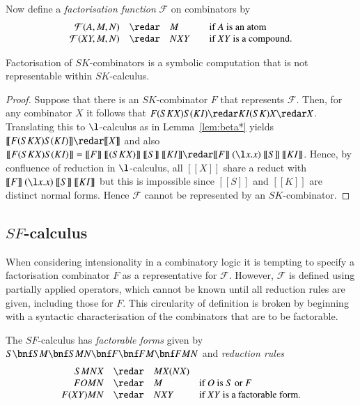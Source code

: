 \documentclass{llncs}
\def\ltrans{[\![}
\def\rtrans{]\!]}
\renewcommand{\rew}{\redar}
\begin{document}
Now define a {\em factorisation function} ${\mathcal F}$ on
combinators by
\[
\begin{array}{rcll}
{\mathcal F}(A,M,N) &\rew& M &\mbox{if $A$ is an atom}\\
{\mathcal F}(XY,M,N) &\rew& NXY \quad&\mbox{if $XY$ is a compound.} 
\end{array}
\]


\begin{lemma}
\label{lem:noFinSK:1}
Factorisation of $SK$-combinators is a symbolic computation that is
not representable within $SK$-calculus.
\end{lemma}
\begin{proof}
  Suppose that there is an $SK$-combinator $F$ that represents
  ${\mathcal F}$.  Then, for any combinator $X$ it follows that
$F(SKX)S(KI) \rew  KI(SK)X  \rew X$. Translating this to $\l$-calculus as in Lemma~\ref{lem:beta*} yields
$\ltrans F(SKX)S(KI) \rtrans \rew \ltrans X\rtrans$ and also
$\ltrans F(SKX)S(KI) \rtrans 
=  \ltrans F \rtrans ~\ltrans (SKX)\rtrans~\ltrans S\rtrans~\ltrans KI\rtrans 
\rew \ltrans F \rtrans~ (\l x.x)~\ltrans S\rtrans~\ltrans KI\rtrans$. Hence, by confluence of reduction in $\l$-calculus, all $\ltrans
X\rtrans$ share a reduct with $\ltrans F \rtrans~ (\l x.x)~\ltrans
S\rtrans~\ltrans KI\rtrans$ but this is  impossible since
$\ltrans S\rtrans$ and $\ltrans K\rtrans$ are distinct normal forms.
Hence ${\mathcal F}$ cannot be represented by an  $SK$-combinator. 
\end{proof}

\subsection{$SF$-calculus}
\label{ssec:computation:sec:factor}

When considering intensionality in a combinatory logic it is tempting to specify
a factorisation combinator $F$ as a representative for ${\mathcal F}$.
However, ${\mathcal F}$ is defined using partially applied operators,
which cannot be known until all reduction rules are given,
including those for $F$.
This circularity of definition is broken by beginning with a syntactic
characterisation of the combinators that are to be factorable.
 
The $SF$-calculus \cite{JayGW11} has {\em factorable forms} given by
$S \bnf  SM \bnf SMN \bnf F \bnf FM \bnf FMN$
and {\em reduction rules} 
\[
\begin{array}{rcll}
  SMNX &\rew& MX(NX)\\
  FOMN &\rew& M &\mbox{if $O$ is $S$ or $F$}\\
  F(XY)MN &\rew& NXY &\mbox{if $XY$ is a factorable form.}
\end{array}
\]
\end{document}

